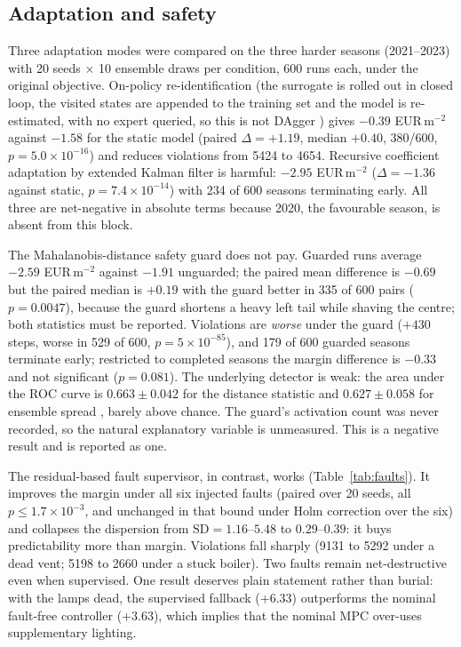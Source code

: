 \subsection{Adaptation and safety}
\label{sec:res-safety}

Three adaptation modes were compared on the three harder seasons (2021--2023) with 20
seeds $\times$ 10 ensemble draws per condition, 600 runs each, under the original
objective. On-policy re-identification (the surrogate is rolled out in closed loop, the visited states are appended to the training set and the model is re-estimated, with no expert queried, so this is not DAgger \cite{ross2011}) gives $-0.39$ EUR\,m$^{-2}$
against $-1.58$ for the static model (paired $\Delta = +1.19$, median $+0.40$, 380/600,
$p=5.0\times10^{-16}$) and reduces violations from 5424 to 4654. Recursive coefficient
adaptation by extended Kalman filter is harmful: $-2.95$ EUR\,m$^{-2}$
($\Delta = -1.36$ against static, $p=7.4\times10^{-14}$) with 234 of 600 seasons
terminating early. All three are net-negative in absolute terms because 2020, the
favourable season, is absent from this block.

The Mahalanobis-distance safety guard \cite{mahalanobis1936,lee2018} does not pay. Guarded
runs average $-2.59$ EUR\,m$^{-2}$ against $-1.91$ unguarded; the paired mean difference is
$-0.69$ but the paired median is $+0.19$ with the guard better in 335 of 600 pairs
($p=0.0047$), because the guard shortens a heavy left tail while shaving the centre; both
statistics must be reported. Violations are \emph{worse} under the guard ($+430$ steps,
worse in 529 of 600, $p=5\times10^{-85}$), and 179 of 600 guarded seasons terminate early;
restricted to completed seasons the margin difference is $-0.33$ and not significant
($p=0.081$). The underlying detector is weak: the area under the ROC curve is
$0.663\pm0.042$ for the distance statistic and $0.627\pm0.058$ for ensemble spread
\cite{lakshminarayanan2017}, barely above chance. The guard's activation count was never
recorded, so the natural explanatory variable is unmeasured. This is a negative result and
is reported as one.

The residual-based fault supervisor, in contrast, works (Table~\ref{tab:faults}). It
improves the margin under all six injected faults (paired over 20 seeds, all
$p\le1.7\times10^{-3}$, and unchanged in that bound under Holm correction over the six)
and collapses the
dispersion from $\text{SD}=1.16$--$5.48$ to $0.29$--$0.39$: it buys predictability more
than margin. Violations fall sharply (9131 to 5292 under a dead vent; 5198 to 2660 under a
stuck boiler). Two faults remain net-destructive even when supervised. One result deserves
plain statement rather than burial: with the lamps dead, the supervised fallback ($+6.33$)
outperforms the nominal fault-free controller ($+3.63$), which implies that the nominal MPC
over-uses supplementary lighting.

